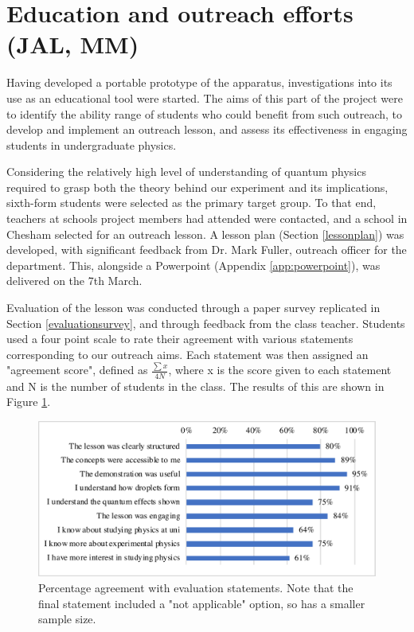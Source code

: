 \section{Education and outreach efforts (JAL, MM)}
Having developed a portable prototype of the apparatus, investigations into its use as an educational tool were started. The aims of this part of the project were to identify the ability range of students who could benefit from such outreach, to develop and implement an outreach lesson, and assess its effectiveness in engaging students in undergraduate physics.

Considering the relatively high level of understanding of quantum physics required to grasp both the theory behind our experiment and its implications, sixth-form students were selected as the primary target group. To that end, teachers at schools project members had attended were contacted, and a school in Chesham selected for an outreach lesson. A lesson plan (Section \ref{lessonplan}) was developed, with significant feedback from Dr. Mark Fuller, outreach officer for the department. This, alongside a Powerpoint (Appendix \ref{app:powerpoint}), was delivered on the 7th March.

Evaluation of the lesson was conducted through a paper survey replicated in Section \ref{evaluationsurvey}, and through feedback from the class teacher. Students used a four point scale to rate their agreement with various statements corresponding to our outreach aims. Each statement was then assigned an "agreement score", defined as $\frac{\sum{x}}{4N}$, where x is the score given to each statement and N is the number of students in the class. The results of this are shown in Figure \ref{fig:evaluationchart}.

\begin{figure}[h]
\centering
\includegraphics[width=\textwidth]{education/evaluationchart.pdf}
\caption{Percentage agreement with evaluation statements. Note that the final statement included a "not applicable" option, so has a smaller sample size.}
\label{fig:evaluationchart}
\end{figure}

